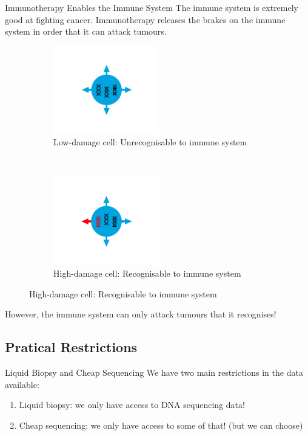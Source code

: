 \documentclass{beamer}
\begin{document}
\begin{frame}{Immunotherapy Enables the Immune System}
The immune system is extremely good at fighting cancer. Immunotherapy releases the brakes on the immune system in order that it can attack tumours.
\begin{figure}[t!]
    \centering
    \begin{subfigure}[t]{0.45\textwidth}
        \centering
        \includegraphics[height=1.5in]{IC1.png}
        \caption{Low-damage cell: Unrecognisable to immune system}
    \end{subfigure}
    ~ 
    \begin{subfigure}[t]{0.45\textwidth}
        \centering
        \includegraphics[height=1.5in]{IC2.png}
        \caption{High-damage cell: Recognisable to immune system}
    \end{subfigure}
\end{figure}
However, the immune system can only attack tumours that it recognises!
\end{frame}
\subsection{Pratical Restrictions}
\begin{frame}{Liquid Biopsy and Cheap Sequencing}
We have two main restrictions in the data available:
\begin{enumerate}[I]
    \item Liquid biopsy: we only have access to DNA sequencing data!
    \item Cheap sequencing: we only have access to some of that! (but we can choose)
\end{enumerate}
\end{frame}
\end{document}
